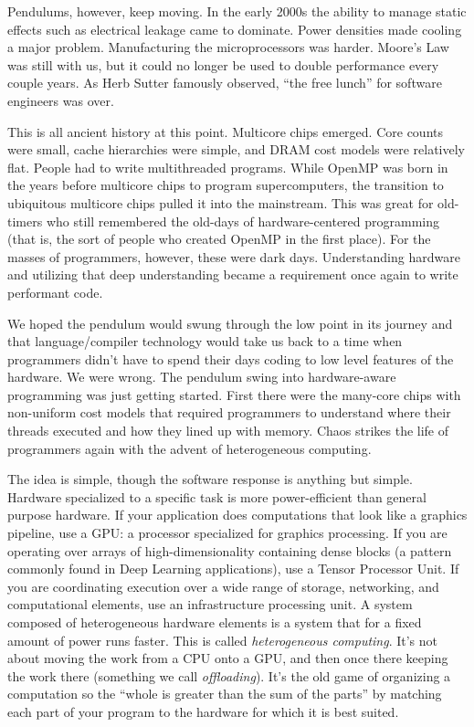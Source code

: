 Pendulums, however, keep moving.  In the early 2000s the ability to manage static effects such as electrical
leakage came to dominate.   Power densities made cooling a major problem.  Manufacturing the microprocessors was harder. Moore's Law was 
still with us, but it could no longer be used to double performance every couple years.
As Herb Sutter famously observed, ``the free lunch'' for software engineers was over. 

This is all ancient history at this point.  Multicore chips emerged.  Core counts were small, cache hierarchies were 
simple, and DRAM cost models were relatively flat.   People had to write multithreaded programs.   While OpenMP
was born in the years before multicore chips to program supercomputers,
the transition to ubiquitous multicore chips pulled it into the mainstream.  This was great for 
old-timers who still remembered the old-days of hardware-centered programming (that is, the sort of people 
who created OpenMP in the first place). For the masses of programmers, however, these were dark days.
Understanding hardware and utilizing that deep understanding became a requirement once again to write performant code.

We hoped the pendulum would swung through the low point in its journey and that language/compiler technology
would take us back to a time when programmers didn't have to spend their days coding to low level features of the
hardware.  We were wrong.  The pendulum swing into hardware-aware programming was just getting started.
First there were the many-core chips with non-uniform cost models that required programmers to understand
where their threads executed and how they lined up with memory.  Chaos strikes the life of programmers again with
the advent of heterogeneous computing.

The idea is simple, though the software response is anything but simple.  Hardware specialized to a specific task is
more power-efficient than general purpose hardware.   If your application does computations that look like a graphics pipeline, 
use a GPU: a processor specialized for graphics processing.  If you are operating over arrays of high-dimensionality containing dense blocks
(a pattern commonly found in Deep Learning applications), use a Tensor Processor Unit.  If
you are coordinating execution over a wide range of storage, networking, and computational elements, use an infrastructure
processing unit. A system composed of heterogeneous hardware elements is a system that for a fixed amount of power runs faster.
This is called \emph{heterogeneous computing}.   It's not about moving the work from a CPU onto a GPU, and then once there 
keeping the work there (something we call \emph{offloading}).   It's the old game of organizing a computation 
so the ``whole is greater than the sum of the parts'' by matching each part of your program to the hardware for which it is best suited.

